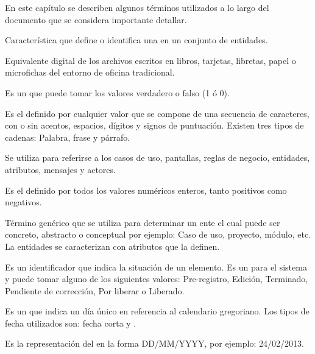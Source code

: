 \label{sec:glosario}
    En este capítulo se describen algunos términos utilizados a lo largo del documento que se considera importante detallar. 
  
\begin{description}
	 Característica que define o identifica una  en un conjunto de entidades.

	 Equivalente digital de los archivos escritos en libros, tarjetas, libretas, papel o microfichas del entorno de oficina tradicional.

	 Es un  que puede tomar los valores verdadero o falso (1 ó 0).
	
	 Es el  definido por cualquier valor que se compone de una secuencia de caracteres, con o sin acentos, espacios, dígitos y 
	signos de puntuación. Existen tres tipos de cadenas: Palabra, frase y párrafo.

	 Se utiliza para referirse a los casos de uso, pantallas, reglas de negocio, entidades, atributos, mensajes y actores.
	
	 Es el   definido por todos los valores numéricos enteros, tanto positivos como negativos.
	
	 Término genérico que se utiliza para determinar un ente el cual puede ser concreto, abstracto o conceptual por ejemplo: Caso de uso, 
		proyecto, módulo, etc. La entidades se caracterizan con atributos que la definen.		
		
	 Es un identificador que indica la situación de un elemento. Es un  para el sistema y puede tomar alguno de los siguientes valores:
	Pre-registro, Edición, Terminado, Pendiente de corrección, Por liberar o Liberado.

	 Es un  que indica un día único en referencia al calendario gregoriano. Los tipos de fecha utilizados son: 
	{fecha corta} y . %

	 Es la representación del   en la forma DD/MM/YYYY, por ejemplo: 24/02/2013.
	

\end{description}
